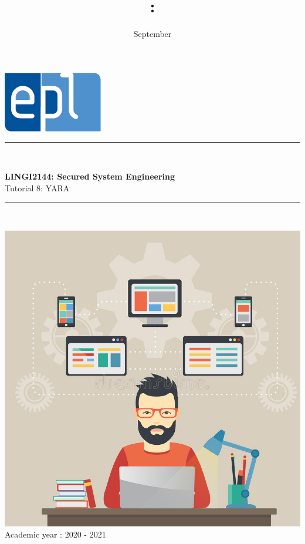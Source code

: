 \documentclass{article}
\title{\codecourse : \titlecourse}
\author{\othor}
\date{September \year}
\newcommand{\codecourse}{LINGI2144}
\newcommand{\titlecourse}{Secured System Engineering}
\newcommand{\ayear}{2020 - 2021}
\begin{document}
        \hfill\includegraphics[scale=0.5]{image/logoepl.png}
        
        \vspace*{\fill}
            
        \begin{center}
        
            \rule{1\textwidth}{1pt}\\
	            \vspace{0.5\baselineskip}
		            \begin{LARGE}
	                	\textbf{\codecourse : \titlecourse}\\
	                	Tutorial 8: YARA
		            \end{LARGE}
		        \vspace{0.5\baselineskip}       
	        \rule{1\textwidth}{1pt}\\
	        
	        \vspace{0.5\baselineskip}
	        
	        \includegraphics[scale=1.5]{image/MCP.jpg}\\

	        \vspace{0.5\baselineskip}
	            Academic year : \ayear\\
                
		\end{center}
		
\end{document}
